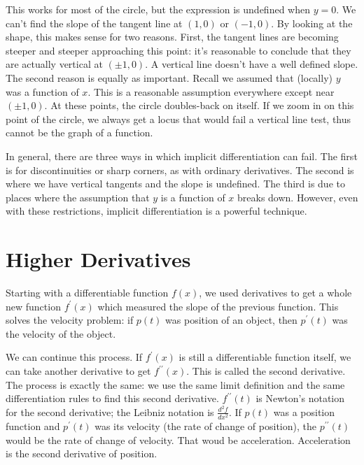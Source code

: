 \documentclass[fleqn]{report}
\begin{document}
This works for most of the circle, but the expression is
undefined when $y=0$. We can't find the slope of the
tangent line at $(1,0)$ or $(-1,0)$. By looking at the shape,
this makes sense for two reasons. First, the tangent lines
are becoming steeper and steeper approaching this point: it's
reasonable to conclude that they are actually vertical at
$(\pm 1,0)$. A vertical line doesn't have a well defined
slope. The second reason is equally as important. Recall we
assumed that (locally) $y$ was a function of $x$. This is a
reasonable assumption everywhere except near $(\pm 1,0)$. At
these points, the circle doubles-back on itself. If we zoom
in on this point of the circle, we always get a locus that
would fail a vertical line test, thus cannot be the graph of a
function.

In general, there are three ways in which implicit
differentiation can fail. The first is for discontinuities or
sharp corners, as with ordinary derivatives. The second is
where we have vertical tangents and the slope is undefined.
The third is due to places where the assumption that $y$ is a
function of $x$ breaks down. However, even with these
restrictions, implicit differentiation is a powerful
technique.

\chapter{Higher Derivatives}
\label{Higher Derivatives}

Starting with a differentiable function $f(x)$, we used
derivatives to get a whole new function $f^\prime(x)$ which
measured the slope of the previous function. This solves the
velocity problem: if $p(t)$ was position of an object, then
$p^\prime(t)$ was the velocity of the object. 

We can continue this process. If $f^\prime(x)$ is still a
differentiable function itself, we can take another derivative
to get $f^{\prime \prime}(x)$. This is called the second
derivative. The process is exactly the same: we use the same
limit definition and the same differentiation rules to find
this second derivative. $f^{\prime \prime}(t)$ is Newton's
notation for the second derivative; the Leibniz notation is
$\frac{d^2 f}{dx^2}.$ If $p(t)$ was a position function and
$p^\prime(t)$ was its velocity (the rate of change of
position), the $p^{\prime \prime}(t)$ would be the rate of
change of velocity. That woud be acceleration. Acceleration
is the second derivative of position. 
\end{document}
